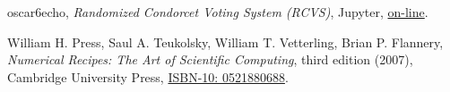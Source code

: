 \documentclass{report}
\theoremstyle{definition}
\theoremstyle{plain}
\begin{document}

\begin{thebibliography}{9}
	oscar6echo,
	\textit{Randomized Condorcet Voting System (RCVS)},
	Jupyter,
	\href{https://nbviewer.jupyter.org/github/oscar6echo/randomized-condorcet-voting-system/blob/master/Randomized-Condorcet-Voting-System.ipynb}{on-line}.

	William H. Press, Saul A. Teukolsky,
	William T. Vetterling, Brian P. Flannery,
	\textit{Numerical Recipes: The Art of Scientific Computing},
	third edition (2007),
	Cambridge University Press,
	\href{http://numerical.recipes/aboutNR3book.html}{ISBN-10: 0521880688}.
\end{thebibliography}
\end{document}

